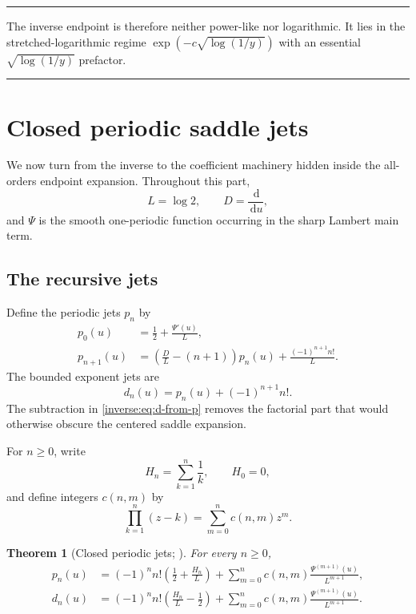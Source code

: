 \documentclass[11pt,oneside]{article}
\newtheorem{theorem}{Theorem}[section]
\theoremstyle{definition}
\theoremstyle{remark}
\newcommand{\dd}{\,\mathrm d}
\newenvironment{boxedremark}{%
  \par\smallskip\noindent\begin{center}\begin{minipage}{0.94\textwidth}%
  \color{black}\hrule\vspace{0.6em}\small
}{%
  \vspace{0.6em}\hrule\end{minipage}\end{center}\smallskip
}
\begin{document}
\begin{boxedremark}
The inverse endpoint is therefore neither power-like nor logarithmic.
It lies in the stretched-logarithmic regime
$\exp(-c\sqrt{\log(1/y)})$ with an essential
$\sqrt{\log(1/y)}$ prefactor.
\end{boxedremark}

\section{Closed periodic saddle jets}
\label{inverse:sec:closed-jets}

We now turn from the inverse to the coefficient machinery hidden inside
the all-orders endpoint expansion.  Throughout this part,
\[
 L=\log2,\qquad D=\frac{\dd}{\dd u},
\]
and $\Psi$ is the smooth one-periodic function occurring in the sharp
Lambert main term.

\subsection{The recursive jets}

Define the periodic jets $p_n$ by
\begin{align}
 p_0(u)&=\frac12+\frac{\Psi'(u)}L, \label{inverse:eq:p0}\\
 p_{n+1}(u)
 &=\left(\frac DL-(n+1)\right)p_n(u)
   +\frac{(-1)^{n+1}n!}{L}. \label{inverse:eq:p-recurrence}
\end{align}
The bounded exponent jets are
\begin{equation}
 d_n(u)=p_n(u)+(-1)^{n+1}n!. \label{inverse:eq:d-from-p}
\end{equation}
The subtraction in \eqref{inverse:eq:d-from-p} removes the factorial part that
would otherwise obscure the centered saddle expansion.

For $n\geq0$, write
\[
 H_n=\sum_{k=1}^n\frac1k,\qquad H_0=0,
\]
and define integers $c(n,m)$ by
\begin{equation}
 \prod_{k=1}^n(z-k)=\sum_{m=0}^n c(n,m)z^m.
 \label{inverse:eq:c-definition}
\end{equation}

\begin{theorem}[Closed periodic jets; \Formalized]
\label{inverse:thm:closed-jets}
For every $n\geq0$,
\begin{align}
 p_n(u)
 &=
 (-1)^n n!\left(\frac12+\frac{H_n}{L}\right)
 +\sum_{m=0}^n
   c(n,m)\frac{\Psi^{(m+1)}(u)}{L^{m+1}},
 \label{inverse:eq:p-closed}\\
 d_n(u)
 &=
 (-1)^n n!\left(\frac{H_n}{L}-\frac12\right)
 +\sum_{m=0}^n
   c(n,m)\frac{\Psi^{(m+1)}(u)}{L^{m+1}}.
 \label{inverse:eq:d-closed}
\end{align}
\end{theorem}
\end{document}
